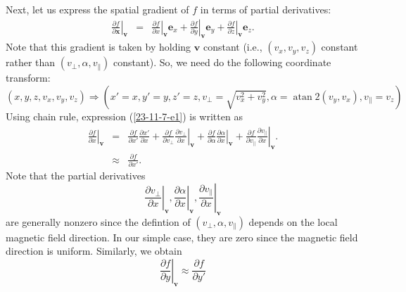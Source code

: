 \documentclass{llncs}
\newcommand{\tmop}[1]{\ensuremath{\operatorname{#1}}}
\begin{document}
Next, let us express the spatial gradient of $f$ in terms of partial
derivatives:
\begin{eqnarray}
  \left. \frac{\partial f}{\partial \mathbf{x}} \right|_{\mathbf{v}} & = &
  \left. \frac{\partial f}{\partial x} \right|_{\mathbf{v}} \mathbf{e}_x +
  \left. \frac{\partial f}{\partial y} \right|_{\mathbf{v}} \mathbf{e}_y +
  \left. \frac{\partial f}{\partial z} \right|_{\mathbf{v}} \mathbf{e}_z . 
  \label{23-11-7-e1}
\end{eqnarray}
Note that this gradient is taken by holding $\mathbf{v}$ constant (i.e.,
$(v_x, v_y, v_z)$ constant rather than $(v_{\perp}, \alpha, v_{\parallel})$
constant). So, we need do the following coordinate transform:
\begin{equation}
  (x, y, z, v_x, v_y, v_z) \Rightarrow \left( x' = x, y' = y, z' = z,
  v_{\perp} = \sqrt{v_x^2 + v_y^2}, \alpha = \tmop{atan} 2 (v_y, v_x),
  v_{\parallel} = v_z \right)
\end{equation}
Using chain rule, expression (\ref{23-11-7-e1}) is written as
\begin{eqnarray}
  \left. \frac{\partial f}{\partial x} \right|_{\mathbf{v}} & = &
  \frac{\partial f}{\partial x'} \frac{\partial x'}{\partial x} +
  \frac{\partial f}{\partial v_{\perp}}  \left. \frac{\partial
  v_{\perp}}{\partial x} \right|_{\mathbf{v}} + \frac{\partial f}{\partial
  \alpha}  \left. \frac{\partial \alpha}{\partial x}  \right|_{\mathbf{v}} +
  \frac{\partial f}{\partial v_{\parallel}}  \left. \frac{\partial
  v_{\parallel}}{\partial x} \right|_{\mathbf{v}} . \\
  & \approx & \frac{\partial f}{\partial x'} . 
\end{eqnarray}
Note that the partial derivatives
\begin{equation}
  \left. \frac{\partial v_{\perp}}{\partial x} \right|_{\mathbf{v}} \left.,
  \frac{\partial \alpha}{\partial x} \right|_{\mathbf{v}}, \left.
  \frac{\partial v_{\parallel}}{\partial x} \right|_{\mathbf{v}}
\end{equation}
are generally nonzero since the defintion of $(v_{\perp}, \alpha,
v_{\parallel})$ depends on the local magnetic field direction. In our simple
case, they are zero since the magnetic field direction is uniform. Similarly,
we obtain
\begin{equation}
  \left. \frac{\partial f}{\partial y} \right|_{\mathbf{v}} \approx
  \frac{\partial f}{\partial y'}
\end{equation}
\end{document}

